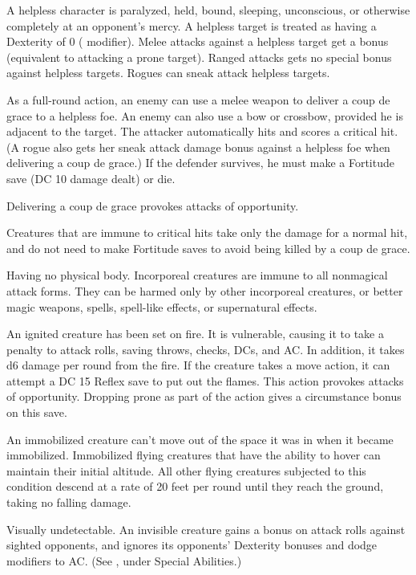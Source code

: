  A helpless character is paralyzed, held, bound, sleeping, unconscious, or otherwise completely at an opponent's mercy. A helpless target is treated as having a Dexterity of 0 ( modifier). Melee attacks against a helpless target get a  bonus (equivalent to attacking a prone target). Ranged attacks gets no special bonus against helpless targets. Rogues can sneak attack helpless targets.

As a full-round action, an enemy can use a melee weapon to deliver a coup de grace to a helpless foe. An enemy can also use a bow or crossbow, provided he is adjacent to the target. The attacker automatically hits and scores a critical hit. (A rogue also gets her sneak attack damage bonus against a helpless foe when delivering a coup de grace.) If the defender survives, he must make a Fortitude save (DC 10 \add damage dealt) or die.

Delivering a coup de grace provokes attacks of opportunity.

Creatures that are immune to critical hits take only the damage for a normal hit, and do not need to make Fortitude saves to avoid being killed by a coup de grace.

 Having no physical body. Incorporeal creatures are immune to all nonmagical attack forms. They can be harmed only by other incorporeal creatures,  or better magic weapons, spells, spell-like effects, or supernatural effects.

 An ignited creature has been set on fire. It is vulnerable, causing it to take a  penalty to attack rolls, saving throws, checks, DCs, and AC. In addition, it takes d6 damage per round from the fire. If the creature takes a move action, it can attempt a DC 15 Reflex save to put out the flames. This action provokes attacks of opportunity. Dropping prone as part of the action gives a  circumstance bonus on this save.

 An immobilized creature can't move out of the space it was in when it became immobilized. Immobilized flying creatures that have the ability to hover can maintain their initial altitude. All other flying creatures subjected to this condition descend at a rate of 20 feet per round until they reach the ground, taking no falling damage.

 Visually undetectable. An invisible creature gains a  bonus on attack rolls against sighted opponents, and ignores its opponents' Dexterity bonuses and dodge modifiers to AC. (See , under Special Abilities.)


